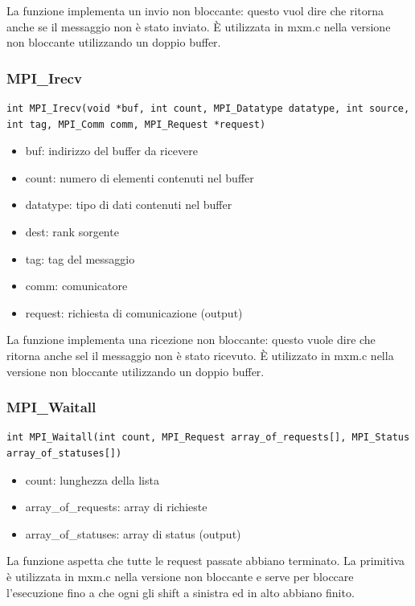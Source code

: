 La funzione implementa un invio non bloccante: questo vuol dire che ritorna anche se il messaggio non \`{e} stato inviato. \`{E} utilizzata in mxm.c nella versione non bloccante utilizzando un doppio buffer.

\subsubsection{MPI\_Irecv}
\begin{lstlisting}
int MPI_Irecv(void *buf, int count, MPI_Datatype datatype, int source, int tag, MPI_Comm comm, MPI_Request *request)
\end{lstlisting}
\begin{itemize}
  \item buf: indirizzo del buffer da ricevere
  \item count: numero di elementi contenuti nel buffer
  \item datatype: tipo di dati contenuti nel buffer
  \item dest: rank sorgente
  \item tag: tag del messaggio
  \item comm: comunicatore
  \item request: richiesta di comunicazione (output)
\end{itemize}

La funzione implementa una ricezione non bloccante: questo vuole dire che ritorna anche sel il messaggio non \`{e} stato ricevuto. \`{E} utilizzato in mxm.c nella versione non bloccante utilizzando un doppio buffer.

\subsubsection{MPI\_Waitall}
\begin{lstlisting}
int MPI_Waitall(int count, MPI_Request array_of_requests[], MPI_Status array_of_statuses[])
\end{lstlisting}
\begin{itemize}
  \item count: lunghezza della lista
  \item array\_of\_requests: array di richieste
  \item array\_of\_statuses: array di status (output)
\end{itemize}

La funzione aspetta che tutte le request passate abbiano terminato. La primitiva \`{e} utilizzata in mxm.c nella versione non bloccante e serve per bloccare l'esecuzione fino a che ogni gli shift a sinistra ed in alto abbiano finito.

